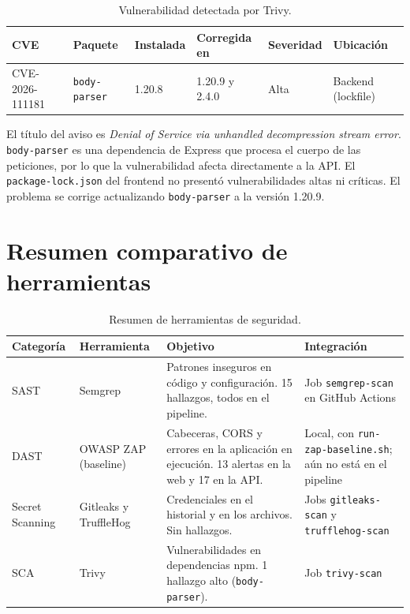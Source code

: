 \begin{table}[H]
\centering
\caption{Vulnerabilidad detectada por Trivy.}
\label{tab:trivy}

\begin{tabularx}{\textwidth}{l l l l l X}
\toprule
\textbf{CVE} &
\textbf{Paquete} &
\textbf{Instalada} &
\textbf{Corregida en} &
\textbf{Severidad} &
\textbf{Ubicación} \\
\midrule
CVE-2026-111181 & \texttt{body-parser} & 1.20.8 & 1.20.9 y 2.4.0 &
Alta & Backend (lockfile) \\
\bottomrule
\end{tabularx}
\end{table}

El título del aviso es \textit{Denial of Service via unhandled decompression
stream error}. \texttt{body-parser} es una dependencia de Express que
procesa el cuerpo de las peticiones, por lo que la vulnerabilidad afecta
directamente a la API. El \texttt{package-lock.json} del frontend no presentó
vulnerabilidades altas ni críticas. El problema se corrige actualizando
\texttt{body-parser} a la versión 1.20.9.


\section{Resumen comparativo de herramientas}

\begin{table}[H]
\centering
\caption{Resumen de herramientas de seguridad.}
\label{tab:herramientas}

\begin{tabularx}{\textwidth}{l l X X}
\toprule
\textbf{Categoría} &
\textbf{Herramienta} &
\textbf{Objetivo} &
\textbf{Integración} \\
\midrule
SAST & Semgrep &
Patrones inseguros en código y configuración. 15 hallazgos, todos en el
pipeline. &
Job \texttt{semgrep-scan} en GitHub Actions \\

DAST & OWASP ZAP (baseline) &
Cabeceras, CORS y errores en la aplicación en ejecución. 13 alertas en la
web y 17 en la API. &
Local, con \texttt{run-zap-baseline.sh}; aún no está en el pipeline \\

Secret Scanning & Gitleaks y TruffleHog &
Credenciales en el historial y en los archivos. Sin hallazgos. &
Jobs \texttt{gitleaks-scan} y \texttt{trufflehog-scan} \\

SCA & Trivy &
Vulnerabilidades en dependencias npm. 1 hallazgo alto (\texttt{body-parser}). &
Job \texttt{trivy-scan} \\
\bottomrule
\end{tabularx}
\end{table}
